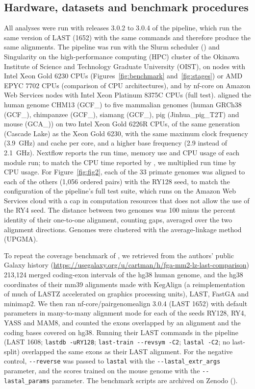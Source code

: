 \documentclass[PCJ,Unicode,screen]{cedram}
\begin{document}
\subsection*{Hardware, datasets and benchmark procedures}

All analyses were run with releases 3.0.2 to 3.0.4 of the pipeline, which run the same version of LAST (1652) with the same commands and therefore produce the same alignments. The pipeline was run with the Slurm scheduler (\cite{Jette_2023}) and Singularity on the high-performance computing (HPC) cluster of the Okinawa Institute of Science and Technology Graduate University (OIST), on nodes with Intel Xeon Gold 6230 CPUs (Figures~\ref{fig:benchmark} and~\ref{fig:stages}) or AMD EPYC 7702 CPUs (comparison of CPU architectures), and by nf-core on Amazon Web Services nodes with Intel Xeon Platinum 8375C CPUs (full test). \citet{Myers_2025} aligned the human genome CHM13 (GCF\_) to five mammalian genomes (human GRCh38 (GCF\_), chimpanzee (GCF\_), siamang (GCF\_), pig (Jinhua\_\allowbreak pig\_\allowbreak T2T) and mouse (GCA\_)) on two Intel Xeon Gold 6226R CPUs, of the same generation (Cascade Lake) as the Xeon Gold 6230, with the same maximum clock frequency (3.9~GHz) and cache per core, and a higher base frequency (2.9 instead of 2.1~GHz). Nextflow reports the run time, memory use and CPU usage of each module run; to match the CPU time reported by \citet{Myers_2025}, we multiplied run time by CPU usage. For Figure~\ref{fig:fig2}, each of the 33 primate genomes was aligned to each of the others (1,056 ordered pairs) with the RY128 seed, to match the configuration of the pipeline's full test suite, which runs on the Amazon Web Services cloud with a cap in computation resources that does not allow the use of the RY4 seed. The distance between two genomes was 100 minus the percent identity of their one-to-one alignment, counting gaps, averaged over the two alignment directions. Genomes were clustered with the average-linkage method (UPGMA).

To repeat the coverage benchmark of \citet{Gulhan_2025}, we retrieved from the authors' public Galaxy history (\url{https://usegalaxy.org/u/cartman/h/fga-mm2-lz-last-comparison}) 213,124 merged coding-exon intervals of the hg38 human genome, and the hg38 coordinates of their mm39 alignments made with KegAlign (a reimplementation of much of LASTZ accelerated on graphics processing units), LAST, FastGA and minimap2. We then ran nf-core/pairgenomealign 3.0.4 (LAST 1652) with default parameters in many-to-many alignment mode for each of the seeds RY128, RY4, YASS and MAM8, and counted the exons overlapped by an alignment and the coding bases covered on hg38. Running their LAST commands in the pipeline (LAST 1608; \texttt{lastdb -uRY128}; \texttt{last-train -{}-revsym -C2}; \texttt{lastal -C2}; no last-split) overlapped the same exons as their LAST alignment. For the negative control, \verb|--reverse| was passed to \texttt{lastal} with the \verb|--lastal_extr_args| parameter, and the scores trained on the mouse genome with the \verb|--lastal_params| parameter. The benchmark scripts are archived on Zenodo (\cite{pairgenomealign_paper_data}).
\end{document}
